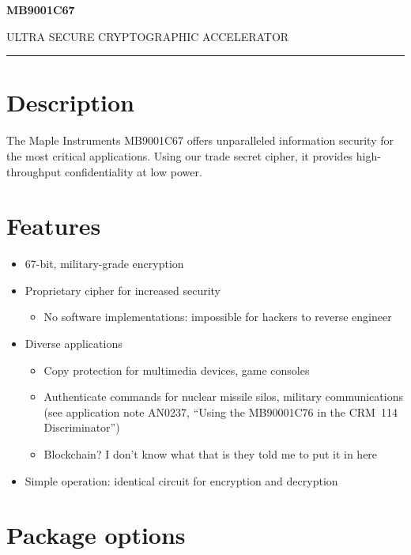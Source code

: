 \documentclass{article}
\begin{document}
{
  \bf
  \noindent
  \Huge
  MB9001C67

  \noindent
  \Large
  ULTRA SECURE CRYPTOGRAPHIC ACCELERATOR

  \noindent\rule{\textwidth}{2pt}
}

\begin{multicols}{2}

  \section{Description}

  The Maple Instruments MB9001C67 offers unparalleled information security for the most critical applications.  Using our trade secret cipher, it provides high-throughput confidentiality at low power.

  \section{Features}

  \begin{itemize}
    \item 67-bit, military-grade encryption
    \item Proprietary cipher for increased security
          \begin{itemize}
            \item No software implementations: impossible for hackers to reverse engineer
          \end{itemize}
    \item Diverse applications
          \begin{itemize}
            \item Copy protection for multimedia devices, game consoles
            \item Authenticate commands for nuclear missile silos, military communications (see application note AN0237, ``Using the MB90001C76 in the CRM~114 Discriminator'')
            \item Blockchain? I don't know what that is they told me to put it in here
          \end{itemize}
    \item Simple operation: identical circuit for encryption and decryption
  \end{itemize}

  \section{Package options}


\end{multicols}
\end{document}
